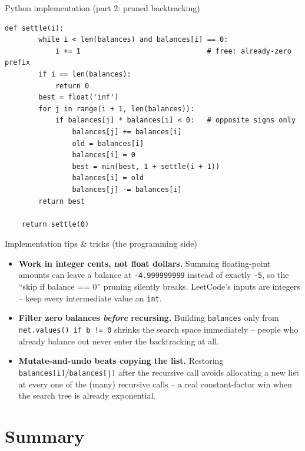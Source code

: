 \documentclass[11pt,aspectratio=169]{beamer}
\begin{document}
\begin{frame}[fragile]{Python implementation (part 2: pruned backtracking)}
  \begin{lstlisting}[style=py,aboveskip=0pt,belowskip=0pt]
    def settle(i):
        while i < len(balances) and balances[i] == 0:
            i += 1                              # free: already-zero prefix
        if i == len(balances):
            return 0
        best = float('inf')
        for j in range(i + 1, len(balances)):
            if balances[j] * balances[i] < 0:   # opposite signs only
                balances[j] += balances[i]
                old = balances[i]
                balances[i] = 0
                best = min(best, 1 + settle(i + 1))
                balances[i] = old
                balances[j] -= balances[i]
        return best

    return settle(0)
  \end{lstlisting}
\end{frame}

\begin{frame}{Implementation tips \& tricks (the programming side)}
  \small
  \begin{itemize}
    \item \textbf{Work in integer cents, not float dollars.} Summing floating-point
    amounts can leave a balance at \texttt{-4.999999999} instead of exactly \texttt{-5},
    so the ``skip if balance == 0'' pruning silently breaks. LeetCode's inputs are
    integers -- keep every intermediate value an \texttt{int}.
    \item \textbf{Filter zero balances \emph{before} recursing.} Building
    \texttt{balances} only from \texttt{net.values() if b != 0} shrinks the search
    space immediately -- people who already balance out never enter the backtracking
    at all.
    \item \textbf{Mutate-and-undo beats copying the list.} Restoring
    \texttt{balances[i]}/\texttt{balances[j]} after the recursive call avoids allocating
    a new list at every one of the (many) recursive calls -- a real constant-factor
    win when the search tree is already exponential.
  \end{itemize}
\end{frame}

\section{Summary}
\end{document}
